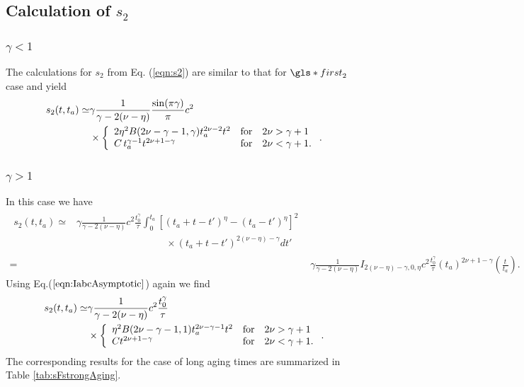 \subsection*{Calculation of $s_2$}

\subsubsection{$\gamma<1$}
The calculations for $s_2$ from Eq. (\ref{eqn:s2}) are similar to that for $\gls*{first}_{2}$ case and yield
\begin{align}
s_{2}(t,t_a) \simeq & \gamma\frac{ 1}{\gamma-2(\nu-\eta)} \frac{\sin(\pi \gamma)}{\pi} c^2 \\
& \times  \left\{ \begin{array}{l l l}
2 \eta^2 B(2\nu -\gamma -1,\gamma)  t_a^{2\nu-2} t^2 & \mathrm{for}& 2\nu> \gamma+1\\
C \, t_a^{\gamma-1}t^{2\nu + 1-\gamma} & \mathrm{for} & 2\nu < \gamma+1.
\end{array} \right. .
\end{align}

\subsubsection{$\gamma>1$}
In this case we have 
\begin{align}
\begin{split}
 s_{2}(t,t_a) \simeq& \gamma \frac{1}{\gamma-2(\nu-\eta)}c^2 \frac{t_0^{\gamma}}{\tau}  \int^{t_a}_{0} \left[ (t_a+t-t')^{\eta}-(t_a-t')^{\eta} \right]^2 \\
& \qquad \qquad \qquad \qquad \quad \times(t_a+t-t')^{2(\nu-\eta)-\gamma} dt' 
 \end{split} \\
  =& \gamma \frac{1}{\gamma-2(\nu-\eta)}I_{2(\nu-\eta)-\gamma,0,\eta} c^2 \frac{t_0^{\gamma}}{\tau} (t_a)^{2\nu+1- \gamma} \left(\frac{t}{t_a}\right) .
\end{align}
Using Eq.($\ref{eqn:IabcAsymptotic}$) again we find
\begin{align}
\begin{split}
s_{2}(t,t_a) \simeq & \gamma \frac{1}{\gamma-2(\nu-\eta)} c^2 \frac{t_0^{\gamma}}{\tau} \\
& \times \left\{ \begin{array}{l l l}
\eta^2  B(2\nu -\gamma -1,1)t_a^{2\nu -\gamma -1} t^2  &\mathrm{for} & 2\nu > \gamma +1 \\
C t^{2\nu +1-\gamma } & \mathrm{for} & 2\nu < \gamma + 1.
\end{array} \right. .
\end{split}
\end{align}
The corresponding results for the case of long aging times are summarized in Table \ref{tab:sFstrongAging}.


